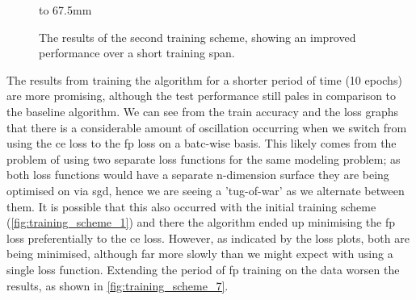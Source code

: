 \begin{figure}[p]
    \hbox to 67.5mm{}%
    \caption[The results of the second training scheme.]{The results of the second training scheme, showing an improved performance over a short training span.}
    \label{fig:training_scheme_2}
\end{figure}

The results from training the algorithm for a shorter period of time (10 epochs) are more promising, although the test performance still pales in comparison to the baseline algorithm. We can see from the train accuracy and the loss graphs that there is a considerable amount of oscillation occurring when we switch from using the \gls{ce} loss to the \gls{fp} loss on a batc-wise basis. This likely comes from the problem of using two separate loss functions for the same modeling problem; as both loss functions would have a separate n-dimension surface they are being optimised on via \gls{sgd}, hence we are seeing a 'tug-of-war' as we alternate between them. It is possible that this also occurred with the initial training scheme (\ref{fig:training_scheme_1}) and there the algorithm ended up minimising the \gls{fp} loss preferentially to the \gls{ce} loss. However, as indicated by the loss plots, both are being minimised, although far more slowly than we might expect with using a single loss function. Extending the period of \gls{fp} training on the data worsen the results, as shown in \ref{fig:training_scheme_7}.
\bigskip



